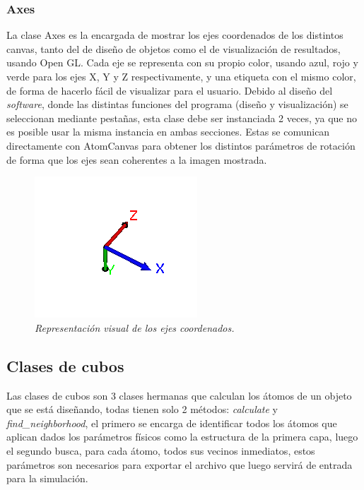 \subsubsection{Axes}

La clase Axes es la encargada de mostrar los ejes coordenados de los distintos canvas, tanto del de diseño de objetos como el de visualización de resultados, usando Open GL.
Cada eje se representa con su propio color, usando azul, rojo y verde para los ejes X, Y y Z respectivamente, y una etiqueta con el mismo color, de forma de hacerlo fácil de visualizar para el usuario.
Debido al diseño del \emph{software}, donde las distintas funciones del programa (diseño y visualización) se seleccionan mediante pestañas, esta clase debe ser instanciada 2 veces, ya que no es posible usar la misma instancia en ambas secciones. Estas se comunican directamente con AtomCanvas para obtener los distintos parámetros de rotación de forma que los ejes sean coherentes a la imagen mostrada.

\begin{figure}[H]
  \centering
  \includegraphics[scale=1]{images/axes}
  \caption{\em Representación visual de los ejes coordenados.}
\end{figure}

\subsection{Clases de cubos}

Las clases de cubos son 3 clases hermanas que calculan los átomos de un objeto que se está diseñando, todas tienen solo 2 métodos: \emph{calculate} y \emph{find\_neighborhood}, el primero se encarga de identificar todos los átomos que aplican dados los parámetros físicos como la estructura de la primera capa, luego el segundo busca, para cada átomo, todos sus vecinos inmediatos, estos parámetros son necesarios para exportar el archivo que luego servirá de entrada para la simulación.

